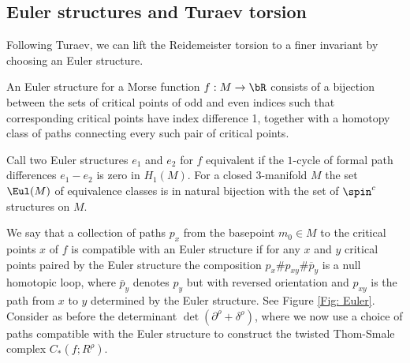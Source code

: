 \subsection{Euler structures and Turaev torsion}
Following Turaev, we can lift the Reidemeister torsion to a finer invariant by choosing an Euler structure.

\begin{definition} An Euler structure for a Morse function $f:M \to \bR$ consists of a bijection between the sets of critical points of odd and even indices such that corresponding critical points have index difference 1, together with a homotopy class of paths connecting every such pair of critical points.
\end{definition}

\begin{remark}
Call two Euler structures $e_1$ and $e_2$ for $f$ equivalent if the $1$-cycle of formal path differences $e_1-e_2$ is zero in $H_1(M)$. For a closed 3-manifold $M$ the set $\Eul(M)$ of equivalence classes is in natural bijection with the set of $\spin^c$ structures on $M$.
\end{remark}

We say that a collection of paths $p_x$ from the basepoint $m_0\in M$ to the critical points $x$ of $f$ is compatible with an Euler structure if for any $x$ and $y$ critical points paired by the Euler structure the composition $p_x \# p_{xy} \# \overline{p}_y $ is a null homotopic loop, where $\overline{p}_y$ denotes $p_y$ but with reversed orientation and $p_{xy}$ is the path from $x$ to $y$ determined by the Euler structure. See Figure \ref{Fig: Euler}. Consider as before the determinant $\det(\partial^\rho + \delta^\rho)$, where we now use a choice of paths compatible with the Euler structure to construct the twisted Thom-Smale complex $C_*(f; R^\rho)$.

